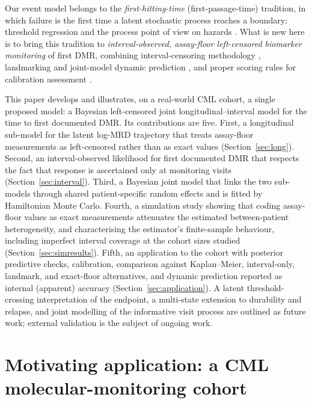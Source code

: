 \documentclass[11pt]{article}
\begin{document}
Our event model belongs to the \emph{first-hitting-time} (first-passage-time)
tradition, in which failure is the first time a latent stochastic process
reaches a boundary: threshold regression \cite{LeeWhitmore2006ThresholdRegression}
and the process point of view on hazards
\cite{AalenGjessing2001ProcessView,AalenBorganGjessing2008}. What is new here is
to bring this tradition to \emph{interval-observed, assay-floor left-censored
biomarker monitoring} of first DMR, combining interval-censoring methodology
\cite{Sun2006IntervalCensored}, landmarking and joint-model dynamic prediction
\cite{vanHouwelingen2007Landmarking,Rizopoulos2011DynamicPredictions}, and proper
scoring rules for calibration assessment \cite{GneitingRaftery2007ProperScoring}.

This paper develops and illustrates, on a real-world CML cohort, a single
proposed model: a Bayesian left-censored joint longitudinal--interval model
for the time to first documented DMR. Its contributions are five. First, a
longitudinal sub-model for the latent log-MRD trajectory that treats
assay-floor measurements as left-censored rather than as exact values
(Section~\ref{sec:long}). Second, an interval-observed likelihood for first
documented DMR that respects the fact that response is ascertained only at
monitoring visits (Section~\ref{sec:interval}). Third, a Bayesian joint
model that links the two sub-models through shared patient-specific random
effects and is fitted by Hamiltonian Monte Carlo. Fourth, a simulation
study showing that coding assay-floor values as exact measurements
attenuates the estimated between-patient heterogeneity, and characterising
the estimator's finite-sample behaviour, including imperfect interval
coverage at the cohort sizes studied (Section~\ref{sec:simresults}). Fifth,
an application to the cohort with posterior predictive checks, calibration,
comparison against Kaplan--Meier, interval-only, landmark, and exact-floor
alternatives, and dynamic prediction reported as internal (apparent)
accuracy (Section~\ref{sec:application}). A latent threshold-crossing
interpretation of the endpoint, a multi-state extension to durability and
relapse, and joint modelling of the informative visit process are outlined
as future work; external validation is the subject of ongoing work.

\section{Motivating application: a CML molecular-monitoring cohort}
\label{sec:motivating}
\end{document}
